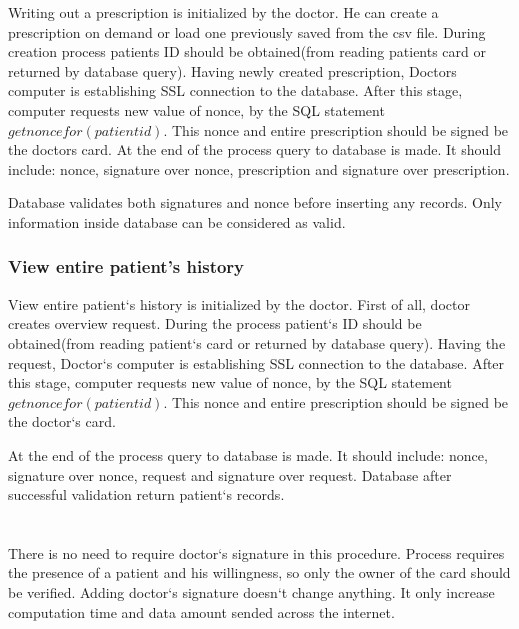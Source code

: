 

Writing out a prescription is initialized by the doctor. He can create a prescription on demand or load one previously saved from the csv file. During creation process patients ID should be obtained(from reading patients card or returned by database query). Having newly created prescription, Doctors computer is establishing SSL connection to the database. After this stage, computer requests new value of nonce, by the SQL statement  $getnoncefor(patientid)$.  This nonce and entire prescription should be signed be the doctors card. At the end of the process query to database is made. It should include: nonce, signature over nonce, prescription and signature over prescription.

Database validates both signatures and nonce before inserting any records. Only information inside database can be considered as valid.
\subsection{View entire patient's history}


View entire patient`s history is initialized by the doctor. First of all, doctor creates overview request. During the process patient`s ID should be obtained(from reading patient`s card or returned by database query). Having the request, Doctor`s computer is establishing SSL connection to the database. After this stage, computer requests new value of nonce, by the SQL statement  $getnoncefor(patientid)$.  This nonce and entire prescription should be signed be the doctor`s card.

At the end of the process query to database is made. It should include: nonce, signature over nonce, request and signature over request.  Database after successful  validation return patient`s records.
\chapter {}
There is no need to require doctor`s signature in this procedure. Process requires the presence of a patient and his willingness, so only the owner of the card should be verified. Adding doctor`s signature doesn`t change anything. It only increase computation time and data amount sended across the internet. 


